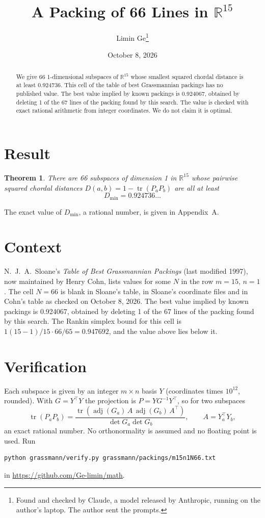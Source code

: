 \documentclass[11pt,a4paper]{article}
\title{A Packing of 66 Lines in $\mathbb{R}^{15}$}
\author{Limin Ge\thanks{Found and checked by Claude, a model released by Anthropic, running on the author's laptop. The author sent the prompts.}}
\date{October 8, 2026}
\newtheorem*{theorem}{Theorem}
\begin{document}
\maketitle
\begin{abstract}
We give 66 1-dimensional subspaces of $\mathbb{R}^{15}$ whose smallest squared chordal distance is at least 0.924736. This cell of the table of best Grassmannian packings has no published value. The best value implied by known packings is 0.924067, obtained by deleting 1 of the 67 lines of the packing found by this search. The value is checked with exact rational arithmetic from integer coordinates. We do not claim it is optimal.
\end{abstract}

\section{Result}
\begin{theorem}
There are 66 subspaces of dimension 1 in $\mathbb{R}^{15}$ whose pairwise squared chordal distances $D(a,b) = 1 - \operatorname{tr}(P_aP_b)$ are all at least
\[ D_{\min} = 0.924736\ldots \]
\end{theorem}
The exact value of $D_{\min}$, a rational number, is given in Appendix~A.


\section{Context}
N.~J.~A.~Sloane's \emph{Table of Best Grassmannian Packings} (last modified 1997), now maintained by Henry Cohn, lists values for some $N$ in the row $m=15$, $n=1$. The cell $N=66$ is blank in Sloane's table, in Sloane's coordinate files and in Cohn's table as checked on October 8, 2026. The best value implied by known packings is 0.924067, obtained by deleting 1 of the 67 lines of the packing found by this search. The Rankin simplex bound for this cell is $1(15-1)/15\cdot 66/65 = 0.947692$, and the value above lies below it.


\section{Verification}
Each subspace is given by an integer $m\times n$ basis $Y$ (coordinates times $10^{12}$, rounded). With $G=Y^\top Y$ the projection is $P=YG^{-1}Y^\top$, so for two subspaces
\[ \operatorname{tr}(P_aP_b)=\frac{\operatorname{tr}(\operatorname{adj}(G_a)\,A\,\operatorname{adj}(G_b)\,A^\top)}{\det G_a\det G_b},\qquad A=Y_a^\top Y_b, \]
an exact rational number. No orthonormality is assumed and no floating point is used. Run
\begin{verbatim}
python grassmann/verify.py grassmann/packings/m15n1N66.txt
\end{verbatim}
in \url{https://github.com/Ge-limin/math}.
\end{document}
